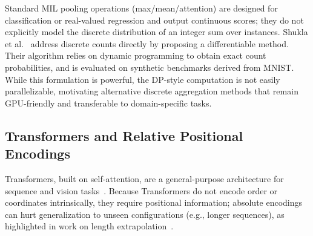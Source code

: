 \documentclass{article}
\theoremstyle{plain}
\theoremstyle{definition}
\theoremstyle{remark}
\begin{document}
    Standard MIL pooling operations (max/mean/attention) are designed for 
    classification or real-valued regression and output continuous scores; they do not 
    explicitly model the discrete distribution of an integer sum over instances.
    Shukla et al.~ address discrete counts directly by 
    proposing a differentiable method. Their algorithm relies on dynamic programming to obtain exact count probabilities, and is evaluated on synthetic benchmarks derived from MNIST. 
    While this formulation is powerful, the DP-style computation is not easily parallelizable, motivating alternative discrete aggregation methods that remain GPU-friendly and transferable to domain-specific tasks.
    	
	

\subsection{Transformers and Relative Positional Encodings}
Transformers, built on self-attention, are a general-purpose architecture for sequence and vision tasks~\cite{vaswani2017attention}.
Because Transformers do not encode order or coordinates intrinsically, they require positional information; absolute encodings can hurt generalization to unseen configurations (e.g., longer sequences), as highlighted in work on length extrapolation~\cite{press2022train}.
\end{document}
